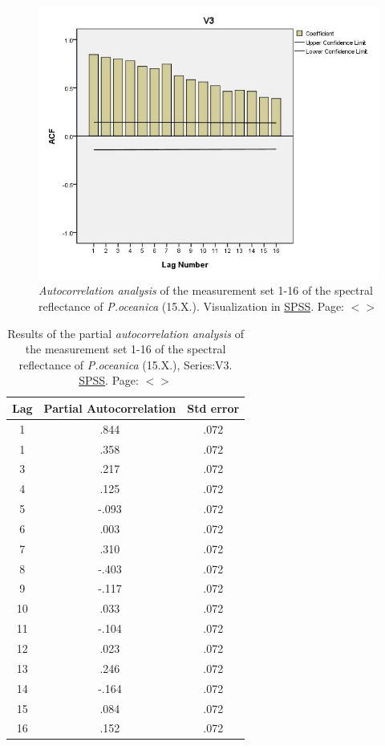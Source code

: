 \documentclass[11pt]{article}
\begin{document}
\begin{appendices}
\begin{figure}[H]
	\includegraphics[scale=0.45]{Autocorr.jpg}
	\caption{\textit{Autocorrelation analysis} of the measurement set 1-16 of the spectral reflectance of \textit{P.oceanica} (15.X.). Visualization in \href{http://www.spss.com/}{SPSS}. Page: $<$\pageref{A-23}$>$}
	\label{fig:A.21}
\end{figure}

\begin{table}[htbp]
	\caption{Results of the partial \textit{autocorrelation analysis} of the measurement set 1-16 of the spectral reflectance of \textit{P.oceanica} (15.X.), Series:V3. \href{http://www.spss.com/}{SPSS}. Page: $<$\pageref{page-41}$>$}\label{tab:14}
	\begin{center}
	\begin{tabular}{|c|c|c|}
		\hline\hline
			Lag & Partial Autocorrelation & Std error\\ \hline\hline
			1 & .844 & .072 \\ \hline
			1 &.358 & .072 \\ \hline
			3 & .217 &.072 \\ \hline
			4 & .125 &.072 \\ \hline
			5 & -.093 & .072 \\ \hline
			6 & .003 & .072 \\ \hline
			7 & .310 & .072 \\ \hline
			8 & -.403 & .072 \\ \hline
			9 & -.117 & .072 \\ \hline
			10 & .033 & .072 \\ \hline
			11 & -.104 & .072 \\ \hline
			12 & .023 &.072 \\ \hline
			13 & .246 &.072 \\ \hline
			14 & -.164 & .072 \\ \hline
			15 & .084 & .072 \\ \hline
			16 & .152 & .072 \\ \hline
	\end{tabular}
	\end{center}
\end{table}


\end{appendices}
\end{document}
